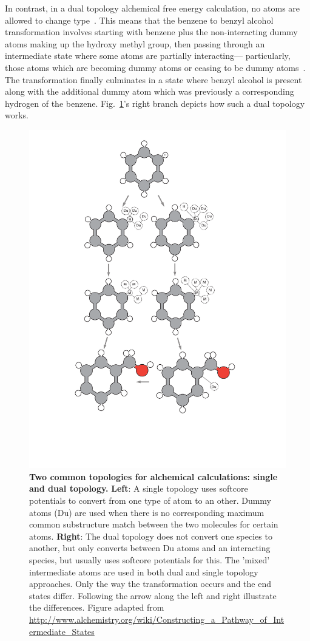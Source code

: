\documentclass[9pt,bestpractices]{livecoms}
\begin{document}
In contrast, in a dual topology alchemical free energy calculation, no atoms are allowed to change type~\cite{shirts2012best}. This means that the benzene to benzyl alcohol transformation involves starting with benzene plus the non-interacting dummy atoms making up the hydroxy methyl group, then passing through an intermediate state where some atoms are partially interacting--- particularly, those atoms which are becoming dummy atoms or ceasing to be dummy atoms~\cite{mobley2014blind}. The transformation finally culminates in a state where benzyl alcohol is present along with the additional dummy atom which was previously a corresponding hydrogen of the benzene. Fig.~\ref{fig:fig_topology}'s right branch depicts how such a dual topology works. 
\begin{figure}
    \includegraphics[width=0.95\columnwidth]{figures/fig3_topol/Figure.pdf}
    \caption{\textbf{Two common topologies for alchemical calculations: single and dual topology.} \textbf{Left}: A single topology uses softcore potentials to convert from one type of atom to an other. Dummy atoms (Du) are used when there is no corresponding maximum common substructure match between the two molecules for certain atoms. \textbf{Right}: The dual topology does not convert one species to another, but only converts between Du atoms and an interacting species, but usually uses softcore potentials for this. The 'mixed' intermediate atoms are used in both dual and single topology approaches. Only the way the transformation occurs and the end states differ. Following the arrow along the left and right illustrate the differences. Figure adapted from \url{http://www.alchemistry.org/wiki/Constructing_a_Pathway_of_Intermediate_States}}
    \label{fig:fig_topology}
\end{figure} 
\end{document}

